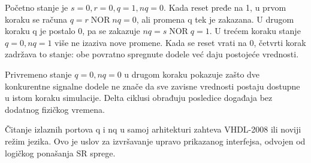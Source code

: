 Početno stanje je \(s=0,r=0,q=1,nq=0\). Kada reset pređe na 1, u prvom koraku se računa \(q=r\operatorname{NOR}nq=0\), ali promena q tek je zakazana. U drugom koraku q je postalo 0, pa se zakazuje \(nq=s\operatorname{NOR}q=1\). U trećem koraku stanje \(q=0,nq=1\) više ne izaziva nove promene. Kada se reset vrati na 0, četvrti korak zadržava to stanje: obe povratno spregnute dodele već daju postojeće vrednosti.

Privremeno stanje \(q=0,nq=0\) u drugom koraku pokazuje zašto dve konkurentne signalne dodele ne znače da sve zavisne vrednosti postaju dostupne u istom koraku simulacije. Delta ciklusi obrađuju posledice događaja bez dodatnog fizičkog vremena.

Čitanje izlaznih portova q i nq u samoj arhitekturi zahteva VHDL-2008 ili noviji režim jezika. Ovo je uslov za izvršavanje upravo prikazanog interfejsa, odvojen od logičkog ponašanja SR sprege.
